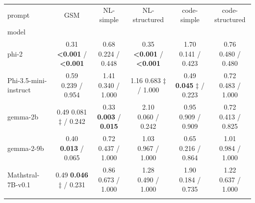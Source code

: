 \documentclass[11pt]{article}
\begin{document}
\begin{table}[H]
\small
\centering
\begin{tabular}{lccccc}
\toprule
prompt & GSM & NL-simple & NL-structured & code-simple & code-structured \\
model &  &  &  &  &  \\
\midrule
phi-2 & \makecell{0.31 \\ \textbf{<0.001} / \textbf{<0.001}} & \makecell{0.68 \\ 0.224 / 0.448} & \makecell{0.35 \\ \textbf{<0.001} / \textbf{<0.001}} & \makecell{1.70 \\ 0.141 / 0.423} & \makecell{0.76 \\ 0.480 / 0.480} \\ \addlinespace
Phi-3.5-mini-instruct & \makecell{0.59 \\ 0.239 / 0.954} & \makecell{1.41 \\ 0.340 / 1.000} & \makecell{1.16 \\ 0.683 $\ddagger$ / 1.000} & \makecell{0.49 \\ \textbf{0.045} $\ddagger$ / 0.223} & \makecell{0.72 \\ 0.483 / 1.000} \\ \addlinespace
gemma-2b & \makecell{0.49 \\ 0.081 $\ddagger$ / 0.242} & \makecell{0.33 \\ \textbf{0.003} / \textbf{0.015}} & \makecell{2.10 \\ 0.060 / 0.242} & \makecell{0.95 \\ 0.909 / 0.909} & \makecell{0.72 \\ 0.413 / 0.825} \\ \addlinespace
gemma-2-9b & \makecell{0.40 \\ \textbf{0.013} / 0.065} & \makecell{0.72 \\ 0.437 / 1.000} & \makecell{1.03 \\ 0.967 / 1.000} & \makecell{0.65 \\ 0.216 / 0.864} & \makecell{1.01 \\ 0.984 / 1.000} \\ \addlinespace
Mathstral-7B-v0.1 & \makecell{0.49 \\ \textbf{0.046} $\ddagger$ / 0.231} & \makecell{0.86 \\ 0.673 / 1.000} & \makecell{1.28 \\ 0.490 / 1.000} & \makecell{1.90 \\ 0.184 / 0.735} & \makecell{1.22 \\ 0.637 / 1.000} \\ \addlinespace

\end{tabular}
\end{table}
\end{document}
